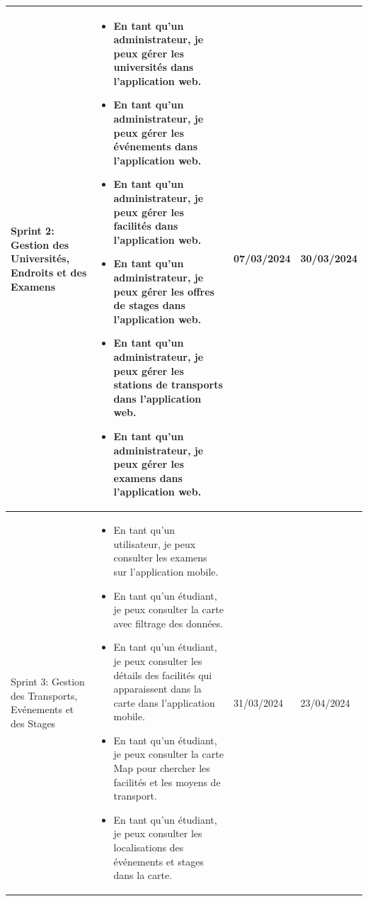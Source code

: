 \begin{sloppypar}
\begin{center}
\begin{longtable}{|>{\raggedright}p{2.8cm}|>{\raggedright}p{8cm}|>{\raggedright\arraybackslash\small}p{1.9cm}|>{\raggedright\arraybackslash\small}p{1.8cm}|}
Sprint 2: Gestion des Universités, Endroits et des Examens & 
\begin{itemize}
    \vspace{-0.8cm}
    \setlength{\leftskip}{-0.4cm}    
    \item En tant qu’un administrateur, je peux gérer les universités dans l’application web.
    \vspace{-0.2cm}
    \item En tant qu’un administrateur, je peux gérer les événements dans l’application web.
    \vspace{-0.2cm}
    \item En tant qu’un administrateur, je peux gérer les facilités dans l’application web.
    \vspace{-0.2cm}
    \item En tant qu’un administrateur, je peux gérer les offres de stages dans l’application web.
    \vspace{-0.2cm}
    \item En tant qu’un administrateur, je peux gérer les stations de transports dans l’application web.
    \vspace{-0.2cm}
    \item En tant qu’un administrateur, je peux gérer les examens dans l’application web.
\end{itemize}
& 07/03/2024 & 30/03/2024 \\
\hline

Sprint 3: Gestion des Transports, Evénements et des Stages & 
\begin{itemize}
    \vspace{-1cm}
    \setlength{\leftskip}{-0.4cm}
    \item En tant qu’un utilisateur, je peux consulter les examens sur l'application mobile.
    \vspace{-0.2cm}
    \item En tant qu’un étudiant, je peux consulter la carte avec filtrage des données.
    \item En tant qu’un étudiant, je peux consulter les détails des facilités qui apparaissent dans la carte dans l’application mobile.
    \vspace{-0.2cm}
    \item En tant qu’un étudiant, je peux consulter la carte Map pour chercher les facilités et les moyens de transport.
    \vspace{-0.2cm}
    \item En tant qu’un étudiant, je peux consulter les localisations des événements et stages dans la carte.
\end{itemize}
& 31/03/2024 & 23/04/2024 \\
\hline


\end{longtable}
\end{center}
\end{sloppypar}
